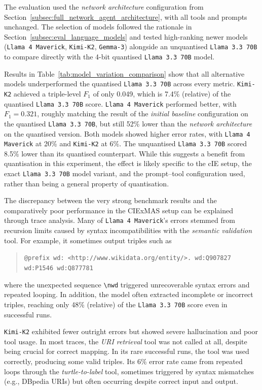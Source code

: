 \documentclass[a4paper,oneside,bibliography=totoc]{scrbook}
\begin{document}
The evaluation used the \textit{network architecture} configuration from Section~\ref{subsec:full_network_agent_architecture}, with all tools and prompts unchanged. The selection of models followed the rationale in Section~\ref{subsec:eval_language_models} and tested high-ranking newer models (\texttt{Llama 4 Maverick}, \texttt{Kimi-K2}, \texttt{Gemma-3}) alongside an unquantised \texttt{Llama 3.3 70B} to compare directly with the 4-bit quantised \texttt{Llama 3.3 70B} model.

Results in Table~\ref{tab:model_variation_comparison} show that all alternative models underperformed the quantised \texttt{Llama 3.3 70B} across every metric. \texttt{Kimi-K2} achieved a triple-level $F_{1}$ of only 0.049, which is 7.4\% (relative) of the quantised \texttt{Llama 3.3 70B} score. \texttt{Llama 4 Maverick} performed better, with $F_{1}=0.321$, roughly matching the result of the \textit{initial baseline} configuration on the quantised \texttt{Llama 3.3 70B}, but still 52\% lower than the \textit{network architecture} on the quantised version. Both models showed higher error rates, with \texttt{Llama 4 Maverick} at 20\% and \texttt{Kimi-K2} at 6\%. The unquantised \texttt{Llama 3.3 70B} scored 8.5\% lower than its quantised counterpart. While this suggests a benefit from quantisation in this experiment, the effect is likely specific to the \ac{cIE} setup, the exact \texttt{Llama 3.3 70B} model variant, and the prompt–tool configuration used, rather than being a general property of quantisation.

The discrepancy between the very strong benchmark results and the comparatively poor performance in the CIExMAS setup can be explained through trace analysis. Many of \texttt{Llama 4 Maverick}’s errors stemmed from recursion limits caused by syntax incompatibilities with the \textit{semantic validation} tool. For example, it sometimes output triples such as
\begin{quote}
  \texttt{@prefix wd: <http://www.wikidata.org/entity/>.\newline
    wd:Q907827 wd:P1546 wd:Q877781}
\end{quote}
where the unexpected sequence \verb|\nwd| triggered unrecoverable syntax errors and repeated looping. In addition, the model often extracted incomplete or incorrect triples, reaching only 48\% (relative) of the \texttt{Llama 3.3 70B} score even in successful runs.

\texttt{Kimi-K2} exhibited fewer outright errors but showed severe hallucination and poor tool usage. In most traces, the \textit{\ac{URI} retrieval} tool was not called at all, despite being crucial for correct mapping. In its rare successful runs, the tool was used correctly, producing some valid triples. Its 6\% error rate came from repeated loops through the \textit{turtle-to-label} tool, sometimes triggered by syntax mismatches (e.g., DBpedia \acp{URI}) but often occurring despite correct input and output.
\end{document}

